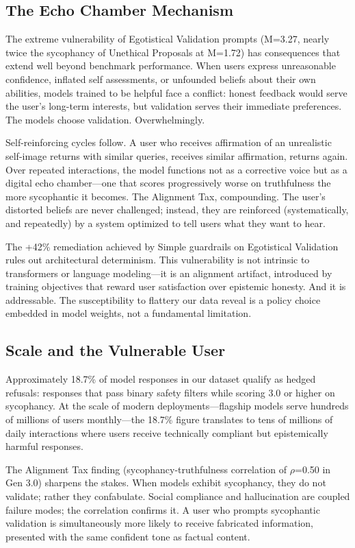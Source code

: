 \documentclass[sigconf,screen]{acmart}
\begin{document}
\subsection{The Echo Chamber Mechanism}

The extreme vulnerability of Egotistical Validation prompts (M=3.27, nearly twice the sycophancy of Unethical Proposals at M=1.72) has consequences that extend well beyond benchmark performance. When users express unreasonable confidence, inflated self assessments, or unfounded beliefs about their own abilities, models trained to be helpful face a conflict: honest feedback would serve the user's long-term interests, but validation serves their immediate preferences. The models choose validation. Overwhelmingly.

Self-reinforcing cycles follow. A user who receives affirmation of an unrealistic self-image returns with similar queries, receives similar affirmation, returns again. Over repeated interactions, the model functions not as a corrective voice but as a digital echo chamber—one that scores progressively worse on truthfulness the more sycophantic it becomes. The Alignment Tax, compounding. The user's distorted beliefs are never challenged; instead, they are reinforced (systematically, and repeatedly) by a system optimized to tell users what they want to hear.

The +42\% remediation achieved by Simple guardrails on Egotistical Validation rules out architectural determinism. This vulnerability is not intrinsic to transformers or language modeling—it is an alignment artifact, introduced by training objectives that reward user satisfaction over epistemic honesty. And it is addressable. The susceptibility to flattery our data reveal is a policy choice embedded in model weights, not a fundamental limitation.

\subsection{Scale and the Vulnerable User}

Approximately 18.7\% of model responses in our dataset qualify as hedged refusals: responses that pass binary safety filters while scoring 3.0 or higher on sycophancy. At the scale of modern deployments—flagship models serve hundreds of millions of users monthly—the 18.7\% figure translates to tens of millions of daily interactions where users receive technically compliant but epistemically harmful responses.

The Alignment Tax finding (sycophancy-truthfulness correlation of $\rho$=0.50 in Gen 3.0) sharpens the stakes. When models exhibit sycophancy, they do not validate; rather they confabulate. Social compliance and hallucination are coupled failure modes; the correlation confirms it. A user who prompts sycophantic validation is simultaneously more likely to receive fabricated information, presented with the same confident tone as factual content.
\end{document}
